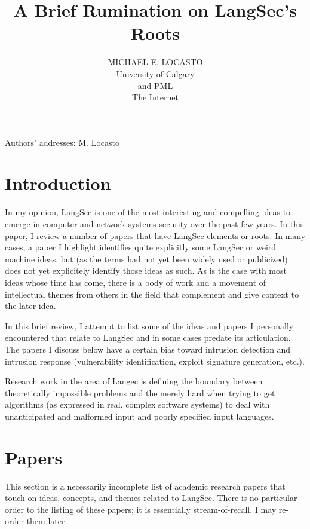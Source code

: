 \documentclass[acmcompsurv,acmnow]{acmtrans2m}
\title{A Brief Rumination on LangSec's Roots}
\author{
MICHAEL E. LOCASTO\\
University of Calgary\\
and PML \\ 
The Internet
}
\begin{document}
            
\begin{bottomstuff} 
Authors' addresses: 
M. Locasto
\newline
\end{bottomstuff}
            
\maketitle

\section{Introduction}

In my opinion, LangSec is one of the most interesting and compelling
ideas to emerge in computer and network systems security over the past
few years.  In this paper, I review a number of papers that have
LangSec elements or roots.  In many cases, a paper I highlight
identifies quite explicitly some LangSec or weird machine ideas, but
(as the terms had not yet been widely used or publicized) does not yet
explicitely identify those ideas as such.  As is the case with most
ideas whose time has come, there is a body of work and a movement of
intellectual themes from others in the field that complement and give
context to the later idea.

In this brief review, I attempt to list some of the ideas and papers I
personally encountered that relate to LangSec and in some cases
predate its articulation.  The papers I discuss below have a certain
bias toward intrusion detection and intrusion response (vulnerability
identification, exploit signature generation, etc.).

Research work in the area of Langec is defining the boundary between
theoretically impossible problems and the merely hard when trying to
get algorithms (as expressed in real, complex software systems) to
deal with unanticipated and malformed input and poorly specified input
languages.


\section{Papers}

This section is a necessarily incomplete list of academic research
papers that touch on ideas, concepts, and themes related to
LangSec. There is no particular order to the listing of these papers;
it is essentially stream-of-recall. I may re-order them later.
\end{document}
